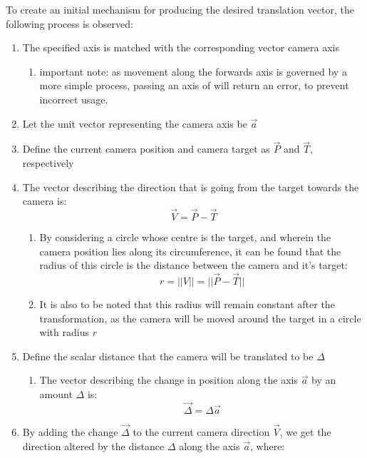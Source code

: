 To create an initial mechanism for producing the desired translation vector, the following process is observed:
\begin{enumerate}
    \item The specified axis is matched with the corresponding vector camera axis
    \begin{enumerate}
        \item important note: as movement along the forwards axis is governed by a more simple process, passing an axis of  will return an error, to prevent incorrect usage.
    \end{enumerate}
    \item Let the unit vector representing the camera axis be $\vec{a}$
    \item Define the current camera position and camera target as $\vec{P}$ and $\vec{T}$, respectively
    \item The vector describing the direction that is going from the target towards the camera is:
    \begin{equation}
        \vec{V} = \vec{P} - \vec{T}
    \end{equation}
    \begin{enumerate}
        \item By considering a circle whose centre is the target, and wherein the camera position lies along its circumference, it can be found that the radius of this circle is the distance between the camera and it's target:
        \begin{equation}
            r = ||V|| = ||\vec{P} - \vec{T}||
        \end{equation}
        \item It is also to be noted that this radius will remain constant after the transformation, as the camera will be moved around the target in a circle with radius $r$
    \end{enumerate}
    \item Define the scalar distance that the camera will be translated to be $\Delta$
    \begin{enumerate}
        \item The vector describing the change in position along the axis $\vec{a}$ by an amount $\Delta$ is:
        \begin{equation}
            \vec{\Delta} = \Delta\vec{a}
        \end{equation}
    \end{enumerate}
    \item By adding the change $\vec{\Delta}$ to the current camera direction $\vec{V}$, we get the direction altered by the distance $\Delta$ along the axis $\vec{a}$, where:

\end{enumerate}
